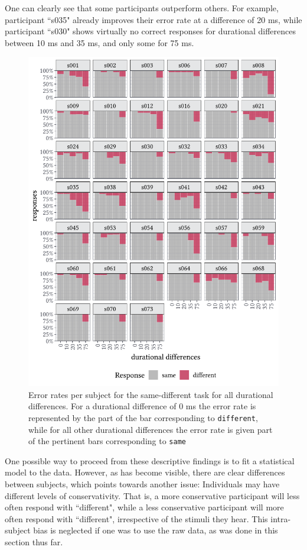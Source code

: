 One can clearly see that some participants outperform others. For example, participant ``s035" already improves their error rate at a difference of 20 ms, while participant ``s030" shows virtually no correct responses for durational differences between 10 ms and 35 ms, and only some for 75 ms.

\begin{figure}
    \centering
    \includegraphics[]{figures/fig6.3.pdf}
    \caption{Error rates per subject for the same-different task for all durational differences. For a durational difference of 0 ms the error rate is represented by the part of the bar corresponding to \texttt{different}, while for all other durational differences the error rate is given part of the pertinent bars corresponding to \texttt{same}}
    \label{fig:6_3}
\end{figure}

One possible way to proceed from these descriptive findings is to fit a statistical model to the data. However, as has become visible, there are clear differences between subjects, which points towards another issue: Individuals may have different levels of conservativity. That is, a more conservative participant will less often respond with ``different", while a less conservative participant will more often respond with ``different", irrespective of the stimuli they hear. This intra-subject bias is neglected if one was to use the raw data, as was done in this section thus far.

